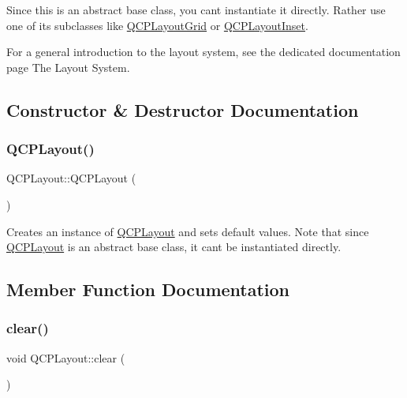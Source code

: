 Since this is an abstract base class, you can\textquotesingle{}t instantiate it directly. Rather use one of its subclasses like \hyperlink{class_q_c_p_layout_grid}{Q\+C\+P\+Layout\+Grid} or \hyperlink{class_q_c_p_layout_inset}{Q\+C\+P\+Layout\+Inset}.

For a general introduction to the layout system, see the dedicated documentation page The Layout System. 

\subsection{Constructor \& Destructor Documentation}
\mbox{\label{class_q_c_p_layout_a04222e6e1361fd802d48f1a25b7020d4}} 
\subsubsection{\texorpdfstring{Q\+C\+P\+Layout()}{QCPLayout()}}
{\footnotesize\ttfamily Q\+C\+P\+Layout\+::\+Q\+C\+P\+Layout (\begin{DoxyParamCaption}{ }\end{DoxyParamCaption})\hspace{0.3cm}{\ttfamily [explicit]}}

Creates an instance of \hyperlink{class_q_c_p_layout}{Q\+C\+P\+Layout} and sets default values. Note that since \hyperlink{class_q_c_p_layout}{Q\+C\+P\+Layout} is an abstract base class, it can\textquotesingle{}t be instantiated directly. 

\subsection{Member Function Documentation}
\mbox{\label{class_q_c_p_layout_a02883bdf2769b5b227f0232dba1ac4ee}} 
\subsubsection{\texorpdfstring{clear()}{clear()}}
{\footnotesize\ttfamily void Q\+C\+P\+Layout\+::clear (\begin{DoxyParamCaption}{ }\end{DoxyParamCaption})}

